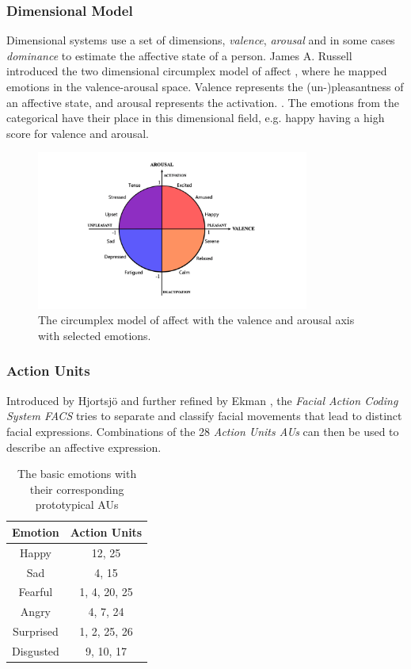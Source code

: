 \subsubsection{Dimensional Model}

Dimensional systems use a set of dimensions, \emph{valence}, \emph{arousal} and in some cases \emph{dominance} to estimate the affective state of a person. James A. Russell introduced the two dimensional circumplex model of affect \cite{russell1980circumplex}, where he mapped emotions in the valence-arousal space. Valence represents the (un-)pleasantness of an affective state, and arousal represents the activation. \cite{posner2005circumplex}. The emotions from the categorical have their place in this dimensional field, e.g. happy having a high score for valence and arousal.

\begin{figure}
    \centering
    \includegraphics[width=0.8\textwidth]{res/circumplex.png}
    \caption{The circumplex model of affect with the valence and arousal axis with selected emotions. \cite{russell1980circumplex} \cite{pourmirzaei2021an}}
    \label{fig:circumplexImg}
\end{figure}

\subsubsection{Action Units}
\label{subsub:au}

Introduced by Hjortsjö \cite{hjortsjo1969man} and further refined by Ekman \cite{friesen1978facial}, the \emph{Facial Action Coding System FACS} tries to separate and classify facial movements that lead to distinct facial expressions. Combinations of the 28 \emph{Action Units AUs} can then be used to describe an affective expression.

\begin{table}[]
    \centering
    \begin{tabular}{c|c}
       \textbf{Emotion}  & \textbf{Action Units} \\ \hline
        Happy & 12, 25 \\
        Sad & 4, 15 \\
        Fearful & 1, 4, 20, 25 \\
        Angry & 4, 7, 24 \\
        Surprised & 1, 2, 25, 26 \\
        Disgusted & 9, 10, 17
    \end{tabular}
    \caption{The basic emotions with their corresponding prototypical AUs \cite{fabian2016emotionet}}
    \label{tab:emotionAUs}
\end{table}

